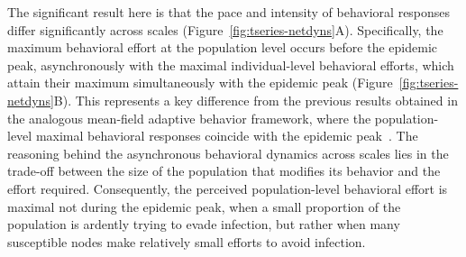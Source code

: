 \documentclass[9pt,twocolumn,twoside]{pnas-new}
\begin{document}
The significant result here is that the pace and intensity of behavioral responses differ significantly across scales (Figure~\ref{fig:tseries-netdyns}A).
Specifically, the maximum behavioral effort at the population level occurs before the epidemic peak, asynchronously with the maximal individual-level behavioral efforts, which attain their maximum simultaneously with the epidemic peak (Figure~\ref{fig:tseries-netdyns}B).
%
This represents a key difference from the previous results obtained in the analogous mean-field adaptive behavior framework, where the population-level maximal behavioral responses coincide with the epidemic peak~\cite{fenichel2011adaptive,perrings2014merging,espinoza2021adaptive,espinoza2022heterogeneous}.
%
%
The reasoning behind the asynchronous behavioral dynamics across scales lies in the trade-off between the size of the population that modifies its behavior and the effort required.
%
Consequently, the perceived population-level behavioral effort is maximal not during the epidemic peak, when a small proportion of the population is ardently trying to evade infection, but rather when many susceptible nodes make relatively small efforts to avoid infection.
%
\end{document}
